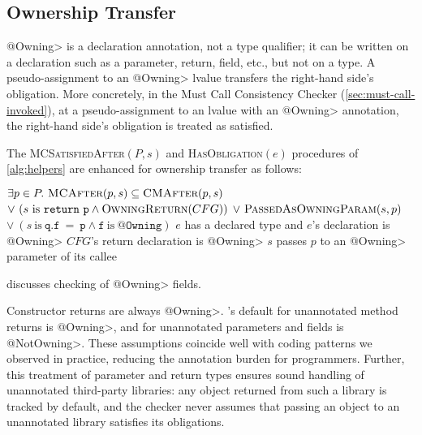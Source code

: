 \subsection{Ownership Transfer}
\label{sec:ownership-transfer}

\<@Owning> is a declaration annotation, not a type qualifier; it can be
written on a declaration such as a parameter, return, field, etc., but not
on a type.
A pseudo-assignment to an \<@Owning> lvalue transfers the right-hand side's
\MustCall obligation.
More concretely, in the Must Call Consistency Checker
(\cref{sec:must-call-invoked}), at a pseudo-assignment to an lvalue with
an \<@Owning> annotation, the right-hand side's
\MustCall obligation is treated as satisfied.

The \textsc{MCSatisfiedAfter}$(P,s)$ and \textsc{HasObligation}$(e)$ procedures 
of \cref{alg:helpers} are enhanced for ownership transfer as follows:
\begin{algorithmic}
  \State \Return $\exists p \in P .\ \textsc{MCAfter}(p,s) \subseteq \textsc{CMAfter}(p,s)$ \newline
  \hspace*{6em} $\vee\ (s \mathrm{\ is\ } \mathtt{return\ p} \wedge \textsc{OwningReturn}(CFG))$ \newline
  \hspace*{6em} $\vee\ \textsc{PassedAsOwningParam}(s,p)$\newline
  \hspace*{6em} $\vee\ (s \mathrm{\ is\ } \mathtt{q.f\ =\ p} \wedge \mathtt{f} \mathrm{\ is\ } \mathtt{@Owning})$
  \EndProcedure
  \State \Return $e$ has a declared \MustCall type and $e$'s declaration is \<@Owning>
  \EndProcedure
  \State \Return $CFG$'s return declaration is \<@Owning>
  \EndProcedure
  \State \Return $s$ passes $p$ to an \<@Owning> parameter of its callee
  \EndProcedure
\end{algorithmic}
 discusses checking of \<@Owning> fields.

Constructor returns are always \<@Owning>.
\Tool's default for unannotated method returns is \<@Owning>,
and for unannotated parameters and fields is \<@NotOwning>.  These assumptions
coincide well with coding patterns we observed in practice, reducing the
annotation burden for programmers.  Further, this treatment of parameter and
return types ensures sound handling of unannotated third-party libraries: any
object returned from such a library is tracked by default, and the checker
never assumes that passing an object to an unannotated library satisfies its obligations.

